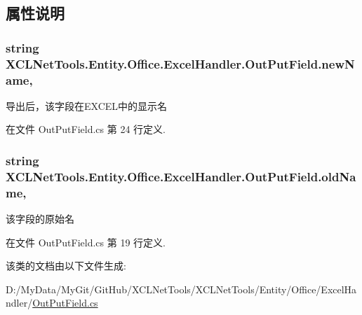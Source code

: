 \subsection{属性说明}
\hypertarget{class_x_c_l_net_tools_1_1_entity_1_1_office_1_1_excel_handler_1_1_out_put_field_a5889d2738a4a65d809b67457e37429fd}{
\subsubsection[{new\-Name}]{\setlength{\rightskip}{0pt plus 5cm}string X\-C\-L\-Net\-Tools.\-Entity.\-Office.\-Excel\-Handler.\-Out\-Put\-Field.\-new\-Name\hspace{0.3cm}{\ttfamily [get]}, {\ttfamily [set]}}}\label{class_x_c_l_net_tools_1_1_entity_1_1_office_1_1_excel_handler_1_1_out_put_field_a5889d2738a4a65d809b67457e37429fd}


导出后，该字段在\-E\-X\-C\-E\-L中的显示名 



在文件 Out\-Put\-Field.\-cs 第 24 行定义.

\hypertarget{class_x_c_l_net_tools_1_1_entity_1_1_office_1_1_excel_handler_1_1_out_put_field_a6f62cc17246410ac6f6a352cd04bc1a2}{
\subsubsection[{old\-Name}]{\setlength{\rightskip}{0pt plus 5cm}string X\-C\-L\-Net\-Tools.\-Entity.\-Office.\-Excel\-Handler.\-Out\-Put\-Field.\-old\-Name\hspace{0.3cm}{\ttfamily [get]}, {\ttfamily [set]}}}\label{class_x_c_l_net_tools_1_1_entity_1_1_office_1_1_excel_handler_1_1_out_put_field_a6f62cc17246410ac6f6a352cd04bc1a2}


该字段的原始名 



在文件 Out\-Put\-Field.\-cs 第 19 行定义.



该类的文档由以下文件生成\-:\begin{DoxyCompactItemize}
\item 
D\-:/\-My\-Data/\-My\-Git/\-Git\-Hub/\-X\-C\-L\-Net\-Tools/\-X\-C\-L\-Net\-Tools/\-Entity/\-Office/\-Excel\-Handler/\hyperlink{_out_put_field_8cs}{Out\-Put\-Field.\-cs}\end{DoxyCompactItemize}
